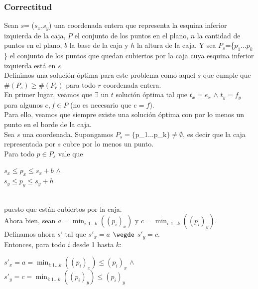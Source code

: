 \subsubsection{Correctitud}

\indent Sean $s$= ($s_{x}$,$s_{y}$) una coordenada entera que representa la esquina inferior izquierda de la caja, $P$ el conjunto de los puntos en el plano, $n$ la cantidad de puntos en el plano, $b$ la base de la caja y $h$ la altura de la caja. Y sea $P_{s}$=\{$p_{1}...p_{k}$\} el conjunto de los puntos que quedan cubiertos por la caja cuya esquina inferior izquierda est\'a en $s$.\\

\indent Definimos una soluci\'on \'optima para este problema como aquel $s$ que cumple que $\#(P_{s}) \geq \#(P_{r}) $ para todo $r$ coordenada entera.\\

\indent En primer lugar, veamos que $\exists$ un $t$ soluci\'on \'optima tal que $t_{x} = e_{x}$ $\wedge$ $t_{y}=f_{y}$ para algunos $e,f \in P$ (no es necesario que $e=f$).\\

\indent Para ello, veamos que siempre existe una soluci\'on \'optima con por lo menos un punto en el borde de la caja.\\

\indent Sea $s$ una coordenada. Supongamos $P_{s}=\{$p_{1}...p_{k}$\}\neq \emptyset$, es decir que la caja representada por $s$ cubre por lo menos un punto.\\
\indent Para todo $p \in P_{s}$ vale que \\
\begin{center}
$s_{x} \leq p_{x} \leq s_{x} + b$  $\wedge$ \\
$s_{y} \leq p_{y} \leq s_{y} + h$\\
\end{center}\\

puesto que est\'an cubiertos por la caja.\\

\indent Ahora bien, sean $a = \min_{i:1...k}((p_{i})_{x})$ y $c = \min_{i:1...k}((p_{i})_{y})$.\\
\indent Definamos ahora $s$' tal que $s'_{x} = a$ $\wegde$ $s'_{y}=c $.\\
\indent Entonces, para todo $i$ desde 1 hasta $k$:\\
\begin{center}
$s'_{x} = a = \min_{i:1...k}((p_{i})_{x}) \leq (p_{i})_{x}$  $\wedge$ \\
$s'_{y} = c = \min_{i:1...k}((p_{i})_{y}) \leq (p_{i})_{y}$  \\
\end{center}\\

